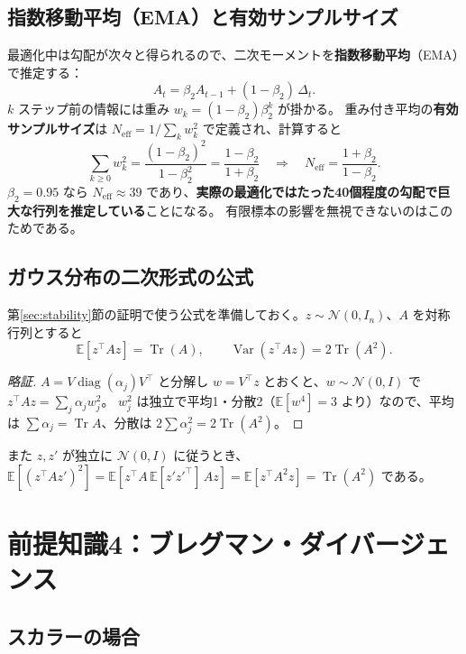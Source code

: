 \documentclass[a4paper,11pt]{ltjsarticle}
\theoremstyle{definition}
\theoremstyle{plain}
\newcommand{\E}{\mathbb{E}}
\DeclareMathOperator{\Tr}{Tr}
\DeclareMathOperator{\diag}{diag}
\DeclareMathOperator{\Var}{Var}
\newcommand{\T}{^{\top}}
\begin{document}
\subsection{指数移動平均（EMA）と有効サンプルサイズ}

最適化中は勾配が次々と得られるので、二次モーメントを\textbf{指数移動平均}（EMA）で推定する：
\begin{equation}
  A_t = \beta_2 A_{t-1} + (1-\beta_2)\,\Delta_t .
\end{equation}
$k$ ステップ前の情報には重み $w_k = (1-\beta_2)\beta_2^k$ が掛かる。
重み付き平均の\textbf{有効サンプルサイズ}は $N_{\mathrm{eff}} = 1/\sum_k w_k^2$ で定義され、計算すると
\[
  \sum_{k\ge0} w_k^2 = \frac{(1-\beta_2)^2}{1-\beta_2^2} = \frac{1-\beta_2}{1+\beta_2}
  \quad\Longrightarrow\quad
  N_{\mathrm{eff}} = \frac{1+\beta_2}{1-\beta_2}.
\]
$\beta_2 = 0.95$ なら $N_{\mathrm{eff}}\approx 39$ であり、\textbf{実際の最適化ではたった40個程度の勾配で巨大な行列を推定している}ことになる。
有限標本の影響を無視できないのはこのためである。

\subsection{ガウス分布の二次形式の公式}

第\ref{sec:stability}節の証明で使う公式を準備しておく。$z\sim\mathcal N(0,I_n)$、$A$ を対称行列とすると
\begin{equation}\label{eq:gauss-quad}
  \E[z\T Az] = \Tr(A),\qquad \Var(z\T Az) = 2\Tr(A^2).
\end{equation}
\begin{proof}[略証]
$A = V\diag(\alpha_j)V\T$ と分解し $w = V\T z$ とおくと、$w\sim\mathcal N(0,I)$ で $z\T Az = \sum_j\alpha_j w_j^2$。
$w_j^2$ は独立で平均1・分散2（$\E[w^4]=3$ より）なので、平均は $\sum\alpha_j = \Tr A$、分散は $2\sum\alpha_j^2 = 2\Tr(A^2)$。
\end{proof}
また $z, z'$ が独立に $\mathcal N(0,I)$ に従うとき、$\E[(z\T Az')^2] = \E[z\T A\,\E[z'z'^\top]\,Az] = \E[z\T A^2 z] = \Tr(A^2)$ である。

\section{前提知識4：ブレグマン・ダイバージェンス}\label{sec:prereq-breg}

\subsection{スカラーの場合}
\end{document}
